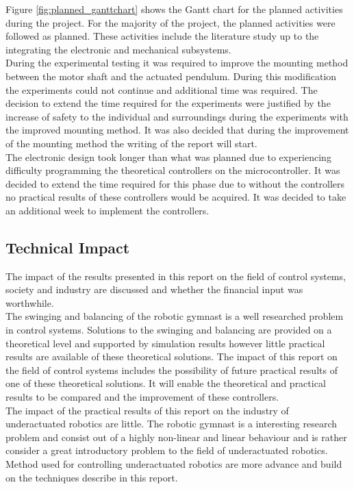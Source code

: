 Figure \ref{fig:planned_ganttchart} shows the Gantt chart for the planned activities during the project. For the majority of the project, the planned activities were followed as planned. These activities include the literature study up to the integrating the electronic and mechanical subsystems.\\

During the experimental testing it was required to improve the mounting method between the motor shaft and the actuated pendulum. During this modification the experiments could not continue and additional time was required. The decision to extend the time required for the experiments were justified by the increase of safety to the individual and surroundings during the experiments with the improved mounting method. It was also decided that during the improvement of the mounting method the writing of the report will start.\\	

The electronic design took longer than what was planned due to experiencing difficulty programming the theoretical controllers on the microcontroller. It was decided to extend the time required for this phase due to without the controllers no practical results of these controllers would be acquired. It was decided to take an additional week to implement the controllers.\\

\subsection{Technical Impact}
The impact of the results presented in this report on the field of control systems, society and industry are discussed and whether the financial input was worthwhile.\\

The swinging and balancing of the robotic gymnast is a well researched problem in control systems. Solutions to the swinging and balancing are provided on a theoretical level and supported by simulation results however little practical results are available of these theoretical solutions. The impact of this report on the field of control systems includes the possibility of future practical results of one of these theoretical solutions. It will enable the theoretical and practical results to be compared and the improvement of these controllers.\\

The impact of the practical results of this report on the industry of underactuated robotics are little. The robotic gymnast is a interesting research problem and consist out of a highly non-linear and linear behaviour and is rather consider a great introductory problem to the field of underactuated robotics. Method used for controlling underactuated robotics are more advance and build on the techniques describe in this report.\\

